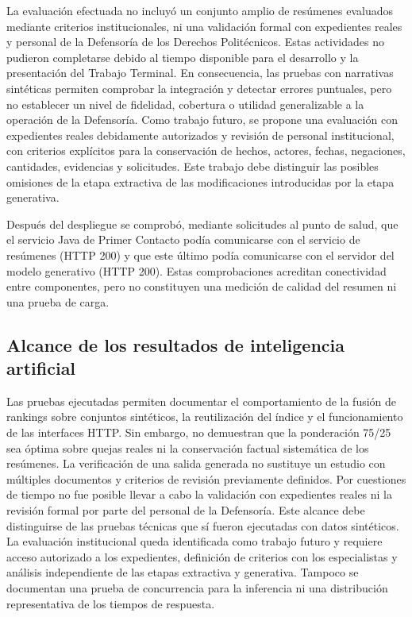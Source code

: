 La evaluación efectuada no incluyó un conjunto amplio de resúmenes evaluados
mediante criterios institucionales, ni una validación formal con expedientes
reales y personal de la Defensoría de los Derechos Politécnicos. Estas actividades
no pudieron completarse debido al tiempo disponible para el desarrollo y la
presentación del Trabajo Terminal. En consecuencia, las pruebas con narrativas
sintéticas permiten comprobar la integración y detectar errores puntuales, pero
no establecer un nivel de fidelidad, cobertura o utilidad generalizable a la
operación de la Defensoría. Como trabajo futuro, se propone una evaluación con
expedientes reales debidamente autorizados y revisión de personal institucional,
con criterios explícitos para la conservación de hechos, actores, fechas,
negaciones, cantidades, evidencias y solicitudes. Este trabajo debe distinguir
las posibles omisiones de la etapa extractiva de las modificaciones introducidas
por la etapa generativa.

Después del despliegue se comprobó, mediante solicitudes al punto de salud, que el servicio
Java de Primer Contacto podía comunicarse con el servicio de resúmenes (HTTP 200) y que
este último podía comunicarse con el servidor del modelo generativo (HTTP 200). Estas
comprobaciones acreditan conectividad entre componentes, pero no constituyen una medición
de calidad del resumen ni una prueba de carga.

\subsection{Alcance de los resultados de inteligencia artificial}

Las pruebas ejecutadas permiten documentar el comportamiento de la fusión de rankings sobre
conjuntos sintéticos, la reutilización del índice y el funcionamiento de las interfaces HTTP.
Sin embargo, no demuestran que la ponderación 75/25 sea óptima sobre quejas reales ni
la conservación factual sistemática de los resúmenes. La verificación de una
salida generada no sustituye un estudio con múltiples documentos y criterios de
revisión previamente definidos. Por cuestiones de tiempo no fue posible llevar
a cabo la validación con expedientes reales ni la revisión formal por parte del
personal de la Defensoría. Este alcance debe distinguirse de las pruebas técnicas
que sí fueron ejecutadas con datos sintéticos. La evaluación institucional queda
identificada como trabajo futuro y requiere acceso autorizado a los expedientes,
definición de criterios con los especialistas y análisis independiente de las
etapas extractiva y generativa. Tampoco se documentan una prueba de concurrencia
para la inferencia ni una distribución representativa de los tiempos de respuesta.

